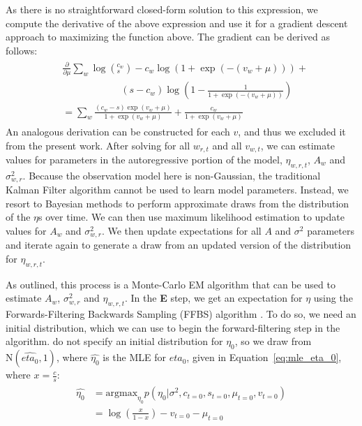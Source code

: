 As there is no straightforward closed-form solution to this expression, we compute the derivative of the above expression and use it for a gradient descent approach to maximizing the function above.  The gradient can be derived as follows:
\begin{align}
\begin{split}
&  \frac{\partial}{\partial \mu} \sum_w \log({}^{c_w}_{s})  - c_w \log(1+ \exp(-(v_w+\mu))) + \\ &\qquad \qquad \qquad (s-c_w) \log (1- \frac{1}{ 1+ \exp(-(v_w+\mu))}) \\
  &=  \sum_w \frac{(c_w-s) \exp(v_w+\mu)}{ 1+ \exp(v_w+\mu)} +\frac{c_w}{1+ \exp(v_w+\mu)} 
  \end{split} 
\end{align}
An analogous derivation can be constructed for each $v$, and thus we excluded it from the present work.  After solving for all $w_{r,t}$ and all $v_{w,t}$, we can estimate values for parameters in the autoregressive portion of the model, $\eta_{w,r,t}$, $A_{w}$ and $\sigma^2_{w,r}$. Because the observation model here is non-Gaussian, the traditional Kalman Filter algorithm cannot be used to learn model parameters. Instead, we resort to Bayesian methods to perform approximate draws from the distribution of the $\eta$s over time. We can then use maximum likelihood estimation to update values for $A_{w}$ and $\sigma^2_{w,r}$.  We then update expectations for all $A$ and $\sigma^2$ parameters and iterate again to generate a draw from an updated version of the distribution for $\eta_{w,r,t}$. 

As outlined, this process is a Monte-Carlo EM algorithm \citep[p. 439]{bishop_pattern_2006}  that can be used to estimate $A_{w}$, $\sigma^2_{w,r}$ and $\eta_{w,r,t}$.  In the {\bf E} step, we get an expectation for $\eta$ using the Forwards-Filtering Backwards Sampling (FFBS) algorithm \citep{godsill_monte_2004}. To do so, we need an initial distribution, which we can use to begin the forward-filtering step in the algorithm. \cite{eisenstein_diffusion_2014} do not specify an initial distribution for $\eta_0$, so we draw from $\mathrm{N}(\hat{eta_0}, 1)$, where $\hat{\eta_0}$ is the MLE for $eta_0$, given in Equation~\ref{eq:mle_eta_0}, where $x=\frac{c}{s}$:
\begin{align} 
\begin{split}
	\hat{\eta_0} &= \text{argmax}_{\eta_0}  p(\eta_0 | \sigma^2, c_{t=0},s_{t=0}, \mu_{t=0}, v_{t=0}) \\
	&= \log(\frac{x}{1-x}) -v_{t=0} -  \mu_{t=0}  \label{eq:mle_eta_0}
	\end{split}
\end{align}

